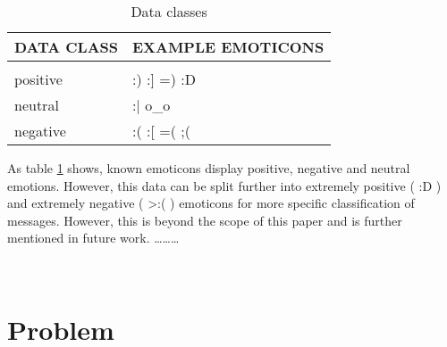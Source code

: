 \documentclass{article} %
\newcommand{\red}[1]{\textit{\color{red}{#1}}}
\begin{document}
\begin{table}[h!]
\caption{Data classes}
\label{tab:classes}
\begin{center}
\begin{tabular}{ll}
\multicolumn{1}{l}{\bf DATA CLASS}  &\multicolumn{1}{l}{\bf EXAMPLE EMOTICONS}
\\ \hline \\
positive 			& :) \: \:  			:] \: \: 		=) \: \: 		:D  	\\
neutral 				& :$\vert$ \: \: 	o\_o  								\\
negative 			& :( \: \: 			:[ \: \: 		=( \: \: 		;( 		\\
\end{tabular}{}
\end{center}
\end{table}
As table \ref{tab:classes} shows, known emoticons display positive, negative and neutral emotions. However, this data can be split further into extremely positive ( :D ) and extremely negative ( >:( ) emoticons for more specific classification of messages. However, this is beyond the scope of this paper and is further mentioned in future work.
\ldots \ldots \ldots 

\red{Finish the introduction, maybe move some parts to the Problem section} \\




\section{Problem}

\begin{comment}
Problem: (roughly 1-2 pages)
• Explain the problem; what kind of assumptions / observations you have about the problem
\end{comment}


\red{Find out what should be actually in this section} \\




\end{document}
